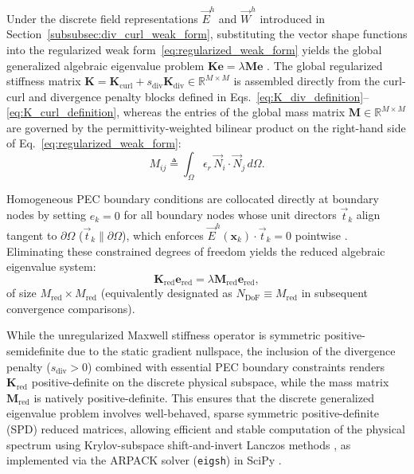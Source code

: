 \documentclass[preprint,12pt]{elsarticle}
\begin{document}
Under the discrete field representations $\vec{E}^h$ and $\vec{W}^h$ introduced in Section~\ref{subsubsec:div_curl_weak_form}, substituting the vector shape functions into the regularized weak form~\eqref{eq:regularized_weak_form} yields the global generalized algebraic eigenvalue problem $\mathbf{K} \mathbf{e} = \lambda \mathbf{M} \mathbf{e}$ \cite{ortiz2023tese, goncalves2025tese}. The global regularized stiffness matrix $\mathbf{K} = \mathbf{K}_{\mathrm{curl}} + s_{\mathrm{div}} \mathbf{K}_{\mathrm{div}} \in \mathbb{R}^{M \times M}$ is assembled directly from the curl-curl and divergence penalty blocks defined in Eqs.~\eqref{eq:K_div_definition}--\eqref{eq:K_curl_definition}, whereas the entries of the global mass matrix $\mathbf{M} \in \mathbb{R}^{M \times M}$ are governed by the permittivity-weighted bilinear product on the right-hand side of Eq.~\eqref{eq:regularized_weak_form}:
\begin{equation}
    M_{ij} \triangleq \int_{\Omega} \epsilon_r \, \vec{N}_i \cdot \vec{N}_j \, d\Omega.
    \label{eq:mass_matrix_entry}
\end{equation}

Homogeneous PEC boundary conditions are collocated directly at boundary nodes by setting $e_k = 0$ for all boundary nodes whose unit directors $\vec{t}_k$ align tangent to $\partial\Omega$ ($\vec{t}_k \parallel \partial\Omega$), which enforces $\vec{E}^h(\mathbf{x}_k) \cdot \vec{t}_k = 0$ pointwise \cite{ortiz2021nodal, goncalves2025tese}. Eliminating these constrained degrees of freedom yields the reduced algebraic eigenvalue system:
\begin{equation}
    \mathbf{K}_{\mathrm{red}} \mathbf{e}_{\mathrm{red}} = \lambda \mathbf{M}_{\mathrm{red}} \mathbf{e}_{\mathrm{red}},
    \label{eq:generalized_eigenvalue_system}
\end{equation}
of size $M_{\mathrm{red}} \times M_{\mathrm{red}}$ (equivalently designated as $N_{\mathrm{DoF}} \equiv M_{\mathrm{red}}$ in subsequent convergence comparisons).

While the unregularized Maxwell stiffness operator is symmetric positive-semidefinite due to the static gradient nullspace, the inclusion of the divergence penalty ($s_{\mathrm{div}} > 0$) combined with essential PEC boundary constraints renders $\mathbf{K}_{\mathrm{red}}$ positive-definite on the discrete physical subspace, while the mass matrix $\mathbf{M}_{\mathrm{red}}$ is natively positive-definite. This ensures that the discrete generalized eigenvalue problem involves well-behaved, sparse symmetric positive-definite (SPD) reduced matrices, allowing efficient and stable computation of the physical spectrum using Krylov-subspace shift-and-invert Lanczos methods \cite{saad2011numerical, lehoucq1998arpack}, as implemented via the ARPACK solver (\texttt{eigsh}) in SciPy \cite{virtanen2020scipy}.
\end{document}
